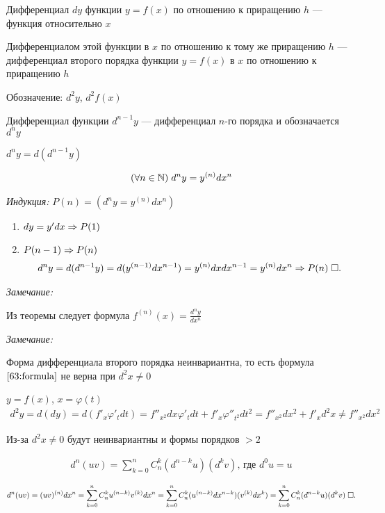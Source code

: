 \documentclass{article}
\begin{document}


Дифференциал $dy$ функции $y=f(x)$ по отношению к приращению $h$ --- функция относительно $x$

Дифференциалом этой функции в $x$ по отношению к тому же приращению $h$ --- дифференциал второго порядка функции $y=f(x)$ в $x$ по отношению к приращению $h$

Обозначение: $d^{2}y$, $d^{2}f(x)$

Дифференциал функции $d^{n-1}y$ --- дифференциал $n$-го порядка и обозначается $d^{n}y$

$d^{n}y=d(d^{n-1}y)$

\theorem
\begin{align}
	(\forall n\in\N)\;d^{n}y=y^{(n)}dx^{n} \label{63:formula}
\end{align}

\proof

{\it Индукция:} $P(n)=(d^{n}y=y^{(n)}dx^{n})$
\begin{enumerate}
	\item{}$dy=y'dx\Rarr P(1)$
	\item{}$P(n-1)\Rarr P(n)$
	\begin{align*}
		d^{n}y=d(d^{n-1}y)=d(y^{(n-1)}dx^{n-1})=y^{(n)}dxdx^{n-1}=y^{(n)}dx^{n}\Rarr P(n)\qed
	\end{align*}
\end{enumerate}

{\it Замечание: }

Из теоремы следует формула $f^{(n)}(x)=\frac{d^{n}y}{dx^{n}}$

{\it Замечание: }

Форма дифференциала второго порядка неинвариантна, то есть формула $\eqref{63:formula}$ не верна при $d^{2}x\neq 0$

$y=f(x)$, $x=\varphi(t)$
\begin{align*}
	d^{2}y=d(dy)=d(f'_{x}\varphi'_{t}dt)=f''_{x^{2}}dx\varphi'_{t}dt+f'_{x}\varphi''_{t^{2}}dt^{2}=f''_{x^{2}}dx^{2}+f'_{x}d^{2}x\neq f''_{x^{2}}dx^{2}
\end{align*}

Из-за $d^{2}x\neq 0$ будут неинвариантны и формы порядков $>2$

\begin{align*}
	d^{n}(uv)=\sum_{k=0}^{n}C_{n}^{k}(d^{n-k}u)(d^{k}v)\text{, где }d^{0}u=u
\end{align*}

\proof
\begin{align*}
	d^{n}(uv)=(uv)^{(n)}dx^{n}=\sum_{k=0}^{n}C_{n}^{k}u^{(n-k)}v^{(k)}dx^{n}=\sum_{k=0}^{n}C_{n}^{k}(u^{(n-k)}dx^{n-k})(v^{(k)}dx^{k})=\sum_{k=0}^{n}C_{n}^{k}(d^{n-k}u)(d^{k}v)\qed
\end{align*}
\end{document}
